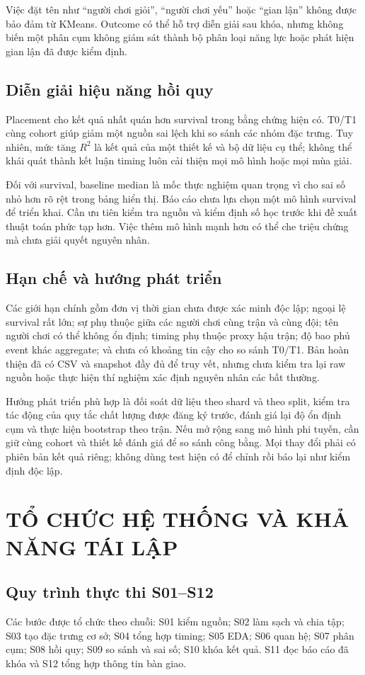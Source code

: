 \documentclass[12pt,a4paper]{article}
\begin{document}
Việc đặt tên như ``người chơi giỏi'', ``người chơi yếu'' hoặc ``gian lận'' không được bảo đảm từ KMeans. Outcome có thể hỗ trợ diễn giải sau khóa, nhưng không biến một phân cụm không giám sát thành bộ phân loại năng lực hoặc phát hiện gian lận đã được kiểm định.
\subsection{Diễn giải hiệu năng hồi quy}
Placement cho kết quả nhất quán hơn survival trong bằng chứng hiện có. T0/T1 cùng cohort giúp giảm một nguồn sai lệch khi so sánh các nhóm đặc trưng. Tuy nhiên, mức tăng $R^2$ là kết quả của một thiết kế và bộ dữ liệu cụ thể; không thể khái quát thành kết luận timing luôn cải thiện mọi mô hình hoặc mọi mùa giải.

Đối với survival, baseline median là mốc thực nghiệm quan trọng vì cho sai số nhỏ hơn rõ rệt trong bảng hiển thị. Báo cáo chưa lựa chọn một mô hình survival để triển khai. Cần ưu tiên kiểm tra nguồn và kiểm định số học trước khi đề xuất thuật toán phức tạp hơn. Việc thêm mô hình mạnh hơn có thể che triệu chứng mà chưa giải quyết nguyên nhân.
\subsection{Hạn chế và hướng phát triển}
Các giới hạn chính gồm đơn vị thời gian chưa được xác minh độc lập; ngoại lệ survival rất lớn; sự phụ thuộc giữa các người chơi cùng trận và cùng đội; tên người chơi có thể không ổn định; timing phụ thuộc proxy hậu trận; độ bao phủ event khác aggregate; và chưa có khoảng tin cậy cho so sánh T0/T1. Bản hoàn thiện đã có CSV và snapshot đầy đủ để truy vết, nhưng chưa kiểm tra lại raw nguồn hoặc thực hiện thí nghiệm xác định nguyên nhân các bất thường.

Hướng phát triển phù hợp là đối soát dữ liệu theo shard và theo split, kiểm tra tác động của quy tắc chất lượng được đăng ký trước, đánh giá lại độ ổn định cụm và thực hiện bootstrap theo trận. Nếu mở rộng sang mô hình phi tuyến, cần giữ cùng cohort và thiết kế đánh giá để so sánh công bằng. Mọi thay đổi phải có phiên bản kết quả riêng; không dùng test hiện có để chỉnh rồi báo lại như kiểm định độc lập.
\clearpage
\section{TỔ CHỨC HỆ THỐNG VÀ KHẢ NĂNG TÁI LẬP}
\subsection{Quy trình thực thi S01--S12}
Các bước được tổ chức theo chuỗi: S01 kiểm nguồn; S02 làm sạch và chia tập; S03 tạo đặc trưng cơ sở; S04 tổng hợp timing; S05 EDA; S06 quan hệ; S07 phân cụm; S08 hồi quy; S09 so sánh và sai số; S10 khóa kết quả. S11 đọc báo cáo đã khóa và S12 tổng hợp thông tin bàn giao.
\end{document}
